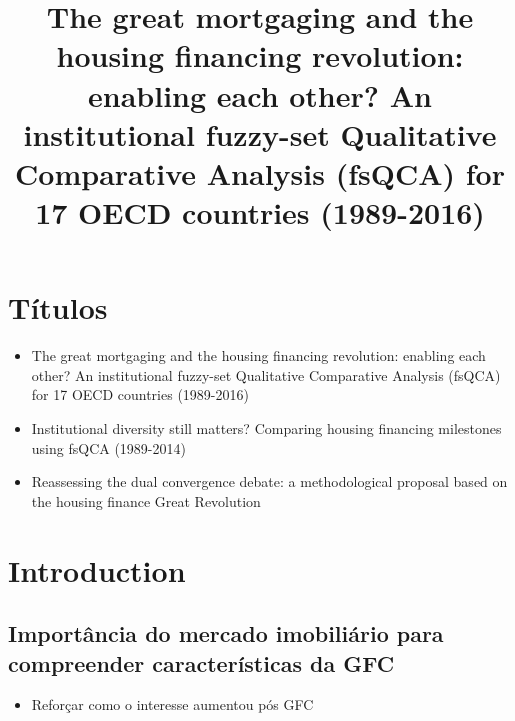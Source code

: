 \documentclass{SelfArx}
\date{}
\title{The great mortgaging and the housing financing revolution: enabling each other? An institutional fuzzy-set Qualitative Comparative Analysis (fsQCA) for 17 OECD countries (1989-2016)}
\begin{document}


\newcommand{\keywordname}{Keywords} %


\flushbottom %
\maketitle %
\thispagestyle{empty} %

\section*{Títulos}
\label{sec:org372e3b6}

\begin{itemize}
\item The great mortgaging and the housing financing revolution: enabling each other? An institutional fuzzy-set Qualitative Comparative Analysis (fsQCA) for 17 OECD countries (1989-2016)
\item Institutional diversity still matters? Comparing housing financing milestones using fsQCA (1989-2014)
\item Reassessing the dual convergence debate: a methodological proposal based on the housing finance Great Revolution
\end{itemize}
\section*{Introduction}
\label{sec:org13525b0}
\subsection*{Importância do mercado imobiliário para compreender características da GFC}
\label{sec:orgf5394ae}
\begin{itemize}
\item Reforçar como o interesse aumentou pós GFC
\end{itemize}
\end{document}
